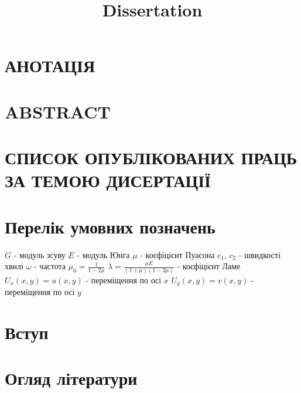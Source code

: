 \documentclass[a4paper,14pt]{extarticle}
\title{Dissertation}
\author{}
\date{}
\numberwithin{equation}{section}
\begin{document}
\section*{\centering АНОТАЦІЯ}


\section*{\centering ABSTRACT}


\section*{\centering СПИСОК ОПУБЛІКОВАНИХ ПРАЦЬ ЗА ТЕМОЮ ДИСЕРТАЦІЇ}


\newpage

\renewcommand{\contentsname}{\centering Зміст}
\tableofcontents

\newpage

\section*{\centering Перелік умовних позначень}
$G$ - модуль зсуву \newline
$E$ - модуль Юнга \newline
$\mu$ - коєфіцієнт Пуасона \newline
$c_1$, $c_2$ - швидкості хвилі \newline
$\omega$ - частота \newline
$\mu_0 = \frac{1}{1 - 2\mu}$ \newline
$\lambda = \frac{\mu E}{(1 + \mu) (1 - 2\mu)}$ - коєфіцієнт Ламе \newline
$U_x(x,y) = u(x,y)$ - переміщення по осі $x$ \newline
$U_y(x,y) = v(x,y)$ - переміщення по осі $y$
\newpage

\section*{\centering Вступ}

\newpage

\section[Огляд літератури]{\centering Огляд літератури}

\newpage
\end{document}
